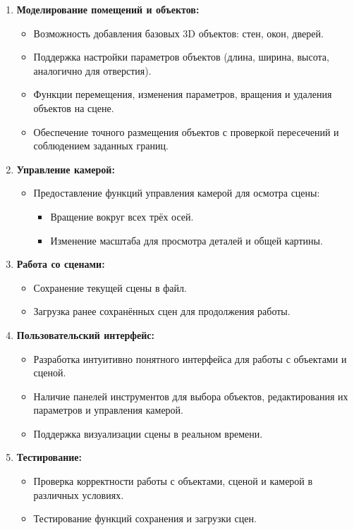 \begin{enumerate}
    \item \textbf{Моделирование помещений и объектов:}
    \begin{itemize}
        \item Возможность добавления базовых 3D объектов: стен, окон, дверей.
        \item Поддержка настройки параметров объектов (длина, ширина, высота, аналогично для отверстия).
        \item Функции перемещения, изменения параметров, вращения и удаления объектов на сцене.
        \item Обеспечение точного размещения объектов с проверкой пересечений и соблюдением заданных границ.
    \end{itemize}
    
    \item \textbf{Управление камерой:}
    \begin{itemize}
        \item Предоставление функций управления камерой для осмотра сцены:
        \begin{itemize}
            \item Вращение вокруг всех трёх осей.
            \item Изменение масштаба для просмотра деталей и общей картины.
        \end{itemize}
    \end{itemize}
    
    \item \textbf{Работа со сценами:}
    \begin{itemize}
        \item Сохранение текущей сцены в файл.
        \item Загрузка ранее сохранённых сцен для продолжения работы.
    \end{itemize}
    
    \item \textbf{Пользовательский интерфейс:}
    \begin{itemize}
        \item Разработка интуитивно понятного интерфейса для работы с объектами и сценой.
        \item Наличие панелей инструментов для выбора объектов, редактирования их параметров и управления камерой.
        \item Поддержка визуализации сцены в реальном времени.
    \end{itemize}
    
    \item \textbf{Тестирование:}
    \begin{itemize}
        \item Проверка корректности работы с объектами, сценой и камерой в различных условиях.
        \item Тестирование функций сохранения и загрузки сцен.
    \end{itemize}
\end{enumerate}

